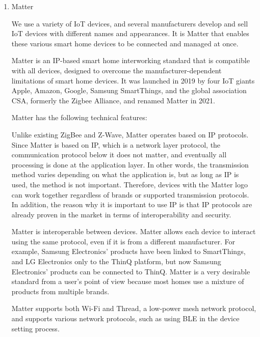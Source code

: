 \documentclass[conference]{IEEEtran}
\begin{document}
\begin{enumerate}[itemsep=2ex, parsep=1ex]
	\item Matter
	      	      
	      We use a variety of IoT devices, and several manufacturers develop and sell
	      IoT devices with different names and appearances. It is Matter that
	      enables these various smart home devices to be connected and managed at
	      once.
	      	      
	      Matter is an IP-based smart home interworking standard that is compatible
	      with all devices, designed to overcome the manufacturer-dependent limitations
	      of smart home devices. It was launched in 2019 by four IoT giants Apple, Amazon,
	      Google, Samsung SmartThings, and the global association CSA, formerly the Zigbee
	      Alliance, and renamed Matter in 2021.
	      	      
	      Matter has the following technical features:
	      	      
	      Unlike existing ZigBee and Z-Wave, Matter operates based on IP protocols. Since
	      Matter is based on IP, which is a network layer protocol, the communication
	      protocol below it does not matter, and eventually all processing is done
	      at the application layer. In other words, the transmission method varies
	      depending on what the application is, but as long as IP is used, the
	      method is not important. Therefore, devices with the Matter logo can work
	      together regardless of brands or supported transmission protocols. In addition,
	      the reason why it is important to use IP is that IP protocols are already
	      proven in the market in terms of interoperability and security.
	      	      
	      Matter is interoperable between devices. Matter allows each device to interact
	      using the same protocol, even if it is from a different manufacturer. For example,
	      Samsung Electronics' products have been linked to SmartThings, and LG
	      Electronics only to the ThinQ platform, but now Samsung Electronics'
	      products can be connected to ThinQ. Matter is a very desirable standard from
	      a user's point of view because most homes use a mixture of products from multiple
	      brands.
	      	      
	      Matter supports both Wi-Fi and Thread, a low-power mesh network protocol, and
	      supports various network protocols, such as using BLE in the device
	      setting process.
	      	      

\end{enumerate}
\end{document}
